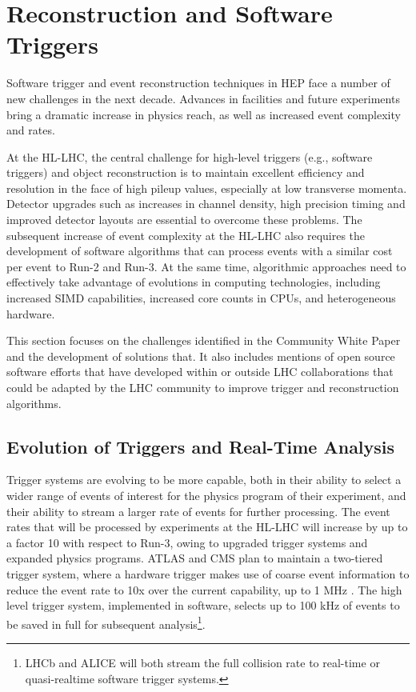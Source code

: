 \hypertarget{reconstruction-and-software-triggers}{%
\section{Reconstruction and Software
Triggers}\label{reconstruction-and-software-triggers}}

Software trigger and event reconstruction techniques in HEP face a
number of new challenges in the next decade. Advances in facilities and
future experiments bring a dramatic increase in physics reach, as well
as increased event complexity and rates.

At the HL-LHC, the central challenge for high-level triggers (e.g.,
software triggers) and object reconstruction is to maintain excellent
efficiency and resolution in the face of high pileup values, especially
at low transverse momenta. Detector upgrades such as increases in
channel density, high precision timing and improved detector layouts are
essential to overcome these problems. The subsequent increase of event
complexity at the HL-LHC also requires the development of software
algorithms that can process events with a similar cost per event to
Run-2 and Run-3. At the same time, algorithmic approaches need to
effectively take advantage of evolutions in computing technologies,
including increased SIMD capabilities, increased core counts in CPUs,
and heterogeneous hardware.

This section focuses on the challenges identified in the Community White
Paper~\cite{Alves:2017she,albrecht2018hepexec,albrecht2018hep} and the development of solutions that. It also includes
mentions of open source software efforts that have developed within or
outside LHC collaborations that could be adapted by the LHC community to
improve trigger and reconstruction algorithms.

\hypertarget{the-evolution-of-triggers-and-real-time-analysis}{%
\subsection{Evolution of Triggers and Real-Time Analysis}\label{the-evolution-of-triggers-and-real-time-analysis}}

Trigger systems are evolving to be more capable, both in their ability
to select a wider range of events of interest for the physics program of
their experiment, and their ability to stream a larger rate of events
for further processing. The event rates that will be processed by
experiments at the HL-LHC will increase by up to a factor 10 with
respect to Run-3, owing to upgraded trigger systems and expanded physics
programs. ATLAS and CMS plan to maintain a two-tiered trigger system,
where a hardware trigger makes use of coarse event information to reduce
the event rate to 10x over the current capability, up to 1 MHz \cite{ATLAS-TDR-29,collaboration:2714892}. The high level trigger system, implemented in software, selects
up to 100 kHz of events to be saved in full for subsequent
analysis\footnote{LHCb \cite{Aaij:2019uij} and ALICE \cite{Buncic:2011297} will both
  stream the full collision rate to real-time or quasi-realtime software
  trigger systems.}.

